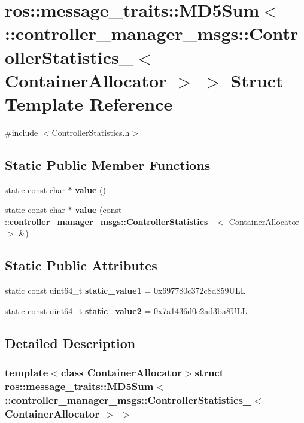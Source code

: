 \section{ros\-:\-:message\-\_\-traits\-:\-:\-M\-D5\-Sum$<$ \-:\-:controller\-\_\-manager\-\_\-msgs\-:\-:\-Controller\-Statistics\-\_\-$<$ \-Container\-Allocator $>$ $>$ \-Struct \-Template \-Reference}
\label{structros_1_1message__traits_1_1MD5Sum_3_01_1_1controller__manager__msgs_1_1ControllerStatistics9738ed3765ef33d8fb8040d3564cc11c}


{\ttfamily \#include $<$\-Controller\-Statistics.\-h$>$}

\subsection*{\-Static \-Public \-Member \-Functions}
\begin{DoxyCompactItemize}
\item 
static const char $\ast$ {\bf value} ()
\item 
static const char $\ast$ {\bf value} (const \-::{\bf controller\-\_\-manager\-\_\-msgs\-::\-Controller\-Statistics\-\_\-}$<$ \-Container\-Allocator $>$ \&)
\end{DoxyCompactItemize}
\subsection*{\-Static \-Public \-Attributes}
\begin{DoxyCompactItemize}
\item 
static const uint64\-\_\-t {\bf static\-\_\-value1} = 0x697780c372c8d859\-U\-L\-L
\item 
static const uint64\-\_\-t {\bf static\-\_\-value2} = 0x7a1436d0e2ad3ba8\-U\-L\-L
\end{DoxyCompactItemize}


\subsection{\-Detailed \-Description}
\subsubsection*{template$<$class Container\-Allocator$>$struct ros\-::message\-\_\-traits\-::\-M\-D5\-Sum$<$ \-::controller\-\_\-manager\-\_\-msgs\-::\-Controller\-Statistics\-\_\-$<$ Container\-Allocator $>$ $>$}



